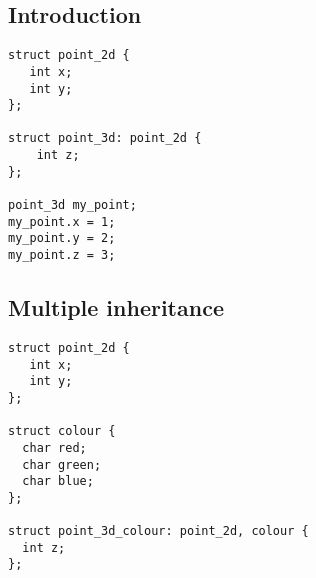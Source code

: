 
\subsection{Introduction}

\begin{verbatim}
struct point_2d {
   int x;
   int y;
};

struct point_3d: point_2d {
    int z;
};

point_3d my_point;
my_point.x = 1;
my_point.y = 2;
my_point.z = 3;

\end{verbatim}

\subsection{Multiple inheritance}

\begin{verbatim}
struct point_2d {
   int x;
   int y;
};

struct colour {
  char red;
  char green;
  char blue;
};

struct point_3d_colour: point_2d, colour {
  int z;
};
\end{verbatim}


